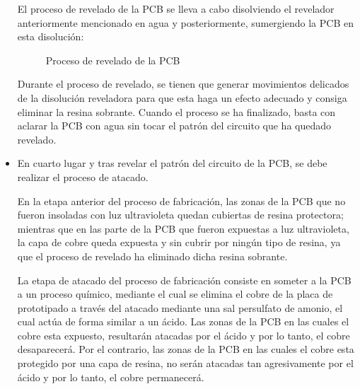 \begin{itemize}
    El proceso de revelado de la PCB se lleva a cabo disolviendo el revelador anteriormente mencionado en agua y posteriormente, sumergiendo la PCB en esta disolución:
    
    \begin{figure}[H]
    \centering
    \caption{Proceso de revelado de la PCB}
    \label{fig:lego}
    \end{figure}
    
    Durante el proceso de revelado, se tienen que generar movimientos delicados de la disolución reveladora para que esta haga un efecto adecuado y consiga eliminar la resina sobrante. Cuando el proceso se ha finalizado, basta con aclarar la PCB con agua sin tocar el patrón del circuito que ha quedado revelado.
    
    \item En cuarto lugar y tras revelar el patrón del circuito de la PCB, se debe realizar el proceso de atacado.
    
   En la etapa anterior del proceso de fabricación, las zonas de la PCB que no fueron insoladas con luz ultravioleta quedan cubiertas de resina protectora; mientras que en las parte de la PCB que fueron expuestas a luz ultravioleta, la capa de cobre queda expuesta y sin cubrir por ningún tipo de resina, ya que el proceso de revelado ha eliminado dicha resina sobrante.
   
   La etapa de atacado del proceso de fabricación consiste en someter a la PCB a un proceso químico, mediante el cual se elimina el cobre de la placa de prototipado a través del atacado mediante una sal persulfato de amonio, el cual actúa de forma similar a un ácido. Las zonas de la PCB en las cuales el cobre esta expuesto, resultarán atacadas por el ácido y por lo tanto, el cobre desaparecerá. Por el contrario, las zonas de la PCB en las cuales el cobre esta protegido por una capa de resina, no serán atacadas tan agresivamente por el ácido y por lo tanto, el cobre permanecerá.
   

\end{itemize}
